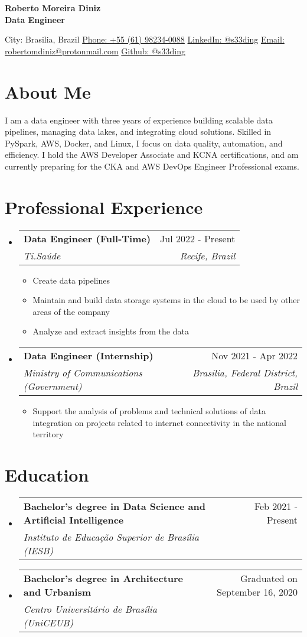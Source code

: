 \documentclass[letterpaper,11pt]{article}%
\makeatletter
\newcommand{\resumeItem}[1]{\item{#1 \vspace{-3pt}}}%
\newcommand{\resumeSubheading}[4]{\vspace{-1pt}\item\begin{tabular*}{0.97\textwidth}[t]{l@{\extracolsep{\fill}}r}\textbf{#1} & #2 \\\textit{\small #3} & \textit{\small #4} \\\end{tabular*}\vspace{-8pt}}%
\newcommand{\resumeSubHeadingListStart}{\begin{itemize}[leftmargin=0.15in, label={}, itemsep=0pt, parsep=0pt]}%
\newcommand{\resumeSubHeadingListEnd}{\end{itemize}}%
\newcommand{\resumeItemListStart}{\begin{itemize}[itemsep=0pt, parsep=0pt]}%
\newcommand{\resumeItemListEnd}{\end{itemize}\vspace{-1pt}}%
\makeatother
\begin{document}
%
\normalsize%
\begin{center}%
{\large \textbf{Roberto Moreira Diniz}} \\ \vspace{3pt}%
{\normalsize \textbf{Data Engineer}} \\ \vspace{3pt}%
\end{center}%
\begin{center}%
City: Brasilia, Brazil \quad \textbullet \quad \href{https://wa.me/qr/UYOUX2DZ7BYHI1}{Phone: +55 (61) 98234-0088} \quad \textbullet \quad \href{https://www.linkedin.com/in/s33ding/}{LinkedIn: @s33ding} \quad \textbullet \quad \href{mailto:robertomdiniz@protonmail.com}{Email: robertomdiniz@protonmail.com} \quad \textbullet \quad \href{https://github.com/s33ding}{Github: @s33ding}%
\end{center}%
\section*{About Me}%
\label{sec:AboutMe}%
I am a data engineer with three years of experience building scalable data pipelines, managing data lakes, and integrating cloud solutions. Skilled in PySpark, AWS, Docker, and Linux, I focus on data quality, automation, and efficiency. I hold the AWS Developer Associate and KCNA certifications, and am currently preparing for the CKA and AWS DevOps Engineer Professional exams.

%
\section*{Professional Experience}%
\label{sec:ProfessionalExperience}%
\resumeSubHeadingListStart%
\resumeSubheading{Data Engineer (Full-Time)}{Jul 2022 - Present}{Ti.Saúde}{Recife, Brazil}%
\resumeItemListStart%
\resumeItem{Create data pipelines}%
\resumeItem{Maintain and build data storage systems in the cloud to be used by other areas of the company}%
\resumeItem{Analyze and extract insights from the data}%
\resumeItemListEnd%
\resumeSubheading{Data Engineer (Internship)}{Nov 2021 - Apr 2022}{Ministry of Communications (Government)}{Brasilia, Federal District, Brazil}%
\resumeItemListStart%
\resumeItem{Support the analysis of problems and technical solutions of data integration on projects related to internet connectivity in the national territory}%
\resumeItemListEnd%
\resumeSubHeadingListEnd

%
\section*{Education}%
\label{sec:Education}%
\resumeSubHeadingListStart%
\resumeSubheading{Bachelor’s degree in Data Science and Artificial Intelligence}{Feb 2021 - Present}{Instituto de Educação Superior de Brasília (IESB)}{}%
\resumeSubHeadingListEnd%
\resumeSubHeadingListStart%
\resumeSubheading{Bachelor’s degree in Architecture and Urbanism}{Graduated on September 16, 2020}{Centro Universitário de Brasília (UniCEUB)}{}%
\resumeSubHeadingListEnd
\end{document}

